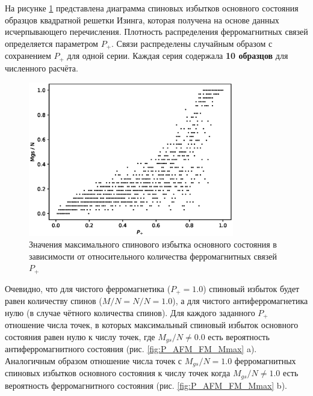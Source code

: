 \documentclass[utf8, babel, sor, jor, amsmath, amssymb, reprint]{elsarticle} %
\begin{document}
На рисунке \ref{fig:Mgs(P+)} представлена диаграмма спиновых избытков основного состояния образцов квадратной решетки Изинга, которая получена на основе данных исчерпывающего перечисления. Плотность распределения ферромагнитных связей определяется параметром $P_+$. Связи распределены случайным образом с сохранением $P_+$ для одной серии. Каждая серия содержала \textbf{10 образцов} для численного расчёта. 

\begin{figure}[H]
	\centering
	\includegraphics[width=0.8\textwidth]{images/Mgs(P+).eps}
	\caption{Значения максимального спинового избытка основного состояния в зависимости от относительного количества ферромагнитных связей $P_+$}
	\label{fig:Mgs(P+)}
\end{figure}

Очевидно, что для чистого ферромагнетика ($P_+ = 1.0$) спиновый избыток будет равен количеству спинов ($M/N = N/N = 1.0$), а для чистого антиферромагнетика нулю (в случае чётного количества спинов). Для каждого заданного $P_+$ отношение числа точек, в которых максимальный спиновый избыток основного состояния равен нулю к числу точек, где $M_{gs}/N \neq 0.0$ есть вероятность антиферромагнитного состояния (рис. \ref{fig:P_AFM_FM_Mmax} a). Аналогичным образом отношение числа точек с $M_{gs}/N = 1.0$ ферромагнитных спиновых избытков основного состояния к числу точек когда $M_{gs}/N \neq 1.0$ есть вероятность ферромагнитного состояния (рис. \ref{fig:P_AFM_FM_Mmax} b).
\end{document}
